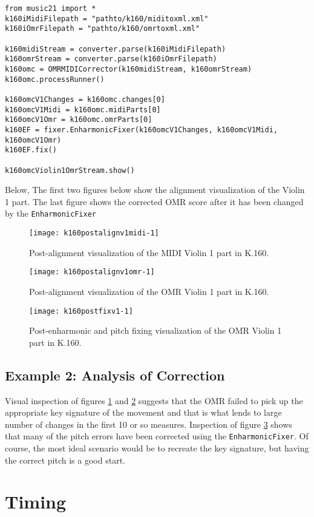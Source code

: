 \begin{verbatim}
from music21 import *
k160iMidiFilepath = "pathto/k160/miditoxml.xml"
k160iOmrFilepath = "pathto/k160/omrtoxml.xml"
         
k160midiStream = converter.parse(k160iMidiFilepath)
k160omrStream = converter.parse(k160iOmrFilepath)
k160omc = OMRMIDICorrector(k160midiStream, k160omrStream)
k160omc.processRunner()
        
k160omcV1Changes = k160omc.changes[0]
k160omcV1Midi = k160omc.midiParts[0]
k160omcV1Omr = k160omc.omrParts[0]
k160EF = fixer.EnharmonicFixer(k160omcV1Changes, k160omcV1Midi, k160omcV1Omr)
k160EF.fix()

k160omcViolin1OmrStream.show()
\end{verbatim}

Below, The first two figures below show the alignment visualization of the Violin 1 part. The last figure shows the corrected OMR score after it has been changed by the \texttt{EnharmonicFixer}

\begin{figure}[H]
\centering
\texttt{[image: k160postalignv1midi-1]}
\caption{Post-alignment visualization of the MIDI Violin 1 part in K.160.}
\label{fig:k160postalignv1midi}
\end{figure}

\begin{figure}[H]
\centering
\texttt{[image: k160postalignv1omr-1]}
\caption{Post-alignment visualization of the OMR Violin 1 part in K.160.}
\label{fig:k160postalignv1omr}
\end{figure}

\begin{figure}[H]
\centering
\texttt{[image: k160postfixv1-1]}
\caption{Post-enharmonic and pitch fixing visualization of the OMR Violin 1 part in K.160.}
\label{fig:k160postfixv1}
\end{figure}

\subsection{Example 2: Analysis of Correction}
Visual inspection of figures \ref{fig:k160postalignv1midi} and \ref{fig:k160postalignv1omr} suggests that the OMR failed to pick up the appropriate key signature of the movement and that is what lends to large number of changes in the first 10 or so measures. Inspection of figure \ref{fig:k160postfixv1} shows that many of the pitch errors have been corrected using the \texttt{EnharmonicFixer}. Of course, the most ideal scenario would be to recreate the key signature, but having the correct pitch is a good start. 

\section{Timing} \label{timing}

